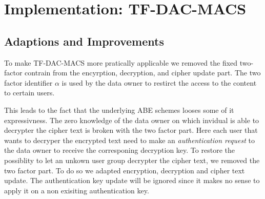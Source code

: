 \section{Implementation: \ac{TF-DAC-MACS}}


\subsection{Adaptions and Improvements}
To make \ac{TF-DAC-MACS} more pratically applicable we removed the fixed two-factor contrain from the encyrption, decryption, and cipher update part. The two factor identifier $\alpha$ is used by the data owner to restirct the access to the content to certain users. 

This leads to the fact that the underlying \ac{ABE} schemes looses some of it expressivness. The zero knowledge of the data owner on which invidual is able to decrypter the cipher text is broken with the two factor part. Here each user that wants to decryper the encrypted text need to make an \textit{authentication request} to the data owner to receive the corresponing decryption key. To restore the possiblity to let an unkown user group decrypter the cipher text, we removed the two factor part. To do so we adapted encryption, decryption and cipher text update. The authentication key update will be ignored since it makes no sense to apply it on a non exisiting authentication key. 

